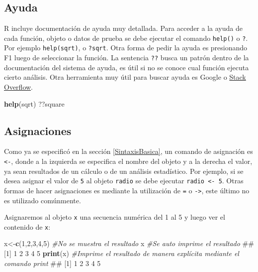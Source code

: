 \documentclass[]{book}
\newenvironment{Shaded}{\begin{snugshade}}{\end{snugshade}}
\newcommand{\KeywordTok}[1]{\textcolor[rgb]{0.13,0.29,0.53}{\textbf{#1}}}
\newcommand{\DecValTok}[1]{\textcolor[rgb]{0.00,0.00,0.81}{#1}}
\newcommand{\CommentTok}[1]{\textcolor[rgb]{0.56,0.35,0.01}{\textit{#1}}}
\newcommand{\NormalTok}[1]{#1}
\begin{document}
\hypertarget{ayuda}{%
\subsection{Ayuda}\label{ayuda}}

R incluye documentación de ayuda muy detallada. Para acceder a la ayuda
de cada función, objeto o datos de prueba se debe ejecutar el comando
\texttt{help()} o \texttt{?}. Por ejemplo \texttt{help(sqrt)}, o
\texttt{?sqrt}. Otra forma de pedir la ayuda es presionando F1 luego de
seleccionar la función. La sentencia \texttt{??} busca un patrón dentro
de la documentación del sistema de ayuda, es útil si no se conoce cual
función ejecuta cierto análisis. Otra herramienta muy útil para buscar
ayuda es Google o \href{https://stackoverflow.com/}{Stack Overflow}.

\begin{Shaded}
\begin{Highlighting}[]
\KeywordTok{help}\NormalTok{(sqrt)}
\NormalTok{??square}
\end{Highlighting}
\end{Shaded}

\hypertarget{asignaciones}{%
\subsection{Asignaciones}\label{asignaciones}}

Como ya se especificó en la sección \ref{SintaxisBasica}, un comando de
asignación es \texttt{\textless{}-}, donde a la izquierda se especifica
el nombre del objeto y a la derecha el valor, ya sean resultados de un
cálculo o de un análisis estadístico. Por ejemplo, si se desea asignar
el valor de \texttt{5} al objeto \texttt{radio} se debe ejecutar
\texttt{radio\ \textless{}-\ 5}. Otras formas de hacer asignaciones es
mediante la utilización de \texttt{=} o \texttt{-\textgreater{}}, este
último no es utilizado comúnmente.

Asignaremos al objeto \texttt{x} una secuencia numérica del 1 al 5 y
luego ver el contenido de \texttt{x}:

\begin{Shaded}
\begin{Highlighting}[]
\NormalTok{x<-}\KeywordTok{c}\NormalTok{(}\DecValTok{1}\NormalTok{,}\DecValTok{2}\NormalTok{,}\DecValTok{3}\NormalTok{,}\DecValTok{4}\NormalTok{,}\DecValTok{5}\NormalTok{)  }\CommentTok{#No se muestra el resultado}
\NormalTok{x                }\CommentTok{#Se auto imprime el resultado}
\NormalTok{## [1] 1 2 3 4 5}
\KeywordTok{print}\NormalTok{(x)         }\CommentTok{#Imprime el resultado de manera explícita mediante el comando print }
\NormalTok{## [1] 1 2 3 4 5}
\end{Highlighting}
\end{Shaded}
\end{document}
